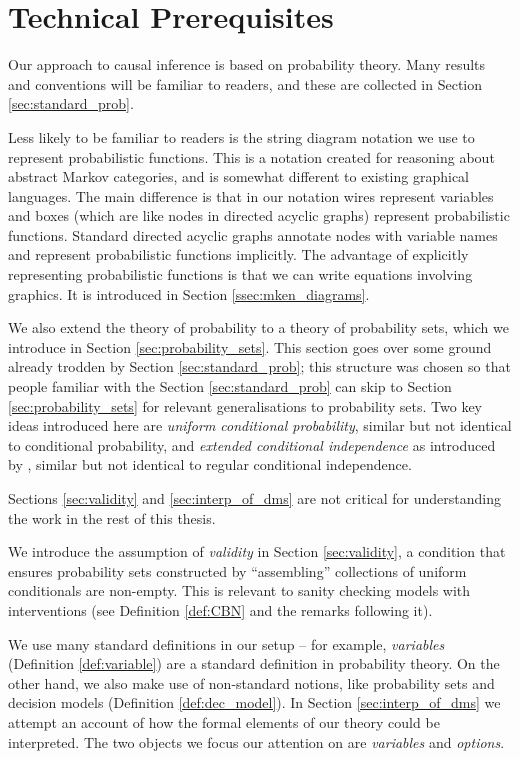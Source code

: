 

\chapter{Technical Prerequisites}\label{ch:tech_prereq}

Our approach to causal inference is based on probability theory. Many results and conventions will be familiar to readers, and these are collected in Section \ref{sec:standard_prob}.

Less likely to be familiar to readers is the string diagram notation we use to represent probabilistic functions. This is a notation created for reasoning about abstract Markov categories, and is somewhat different to existing graphical languages. The main difference is that in our notation wires represent variables and boxes (which are like nodes in directed acyclic graphs) represent probabilistic functions. Standard directed acyclic graphs annotate nodes with variable names and represent probabilistic functions implicitly. The advantage of explicitly representing probabilistic functions is that we can write equations involving graphics. It is introduced in Section \ref{ssec:mken_diagrams}.

We also extend the theory of probability to a theory of probability sets, which we introduce in Section \ref{sec:probability_sets}. This section goes over some ground already trodden by Section \ref{sec:standard_prob}; this structure was chosen so that people familiar with the Section \ref{sec:standard_prob} can skip to Section \ref{sec:probability_sets} for relevant generalisations to probability sets. Two key ideas introduced here are \emph{uniform conditional probability}, similar but not identical to conditional probability, and \emph{extended conditional independence} as introduced by \citet{constantinou_extended_2017}, similar but not identical to regular conditional independence.

Sections \ref{sec:validity} and \ref{sec:interp_of_dms} are not critical for understanding the work in the rest of this thesis. 

We introduce the assumption of \emph{validity} in Section \ref{sec:validity}, a condition that ensures probability sets constructed by ``assembling'' collections of uniform conditionals are non-empty. This is relevant to sanity checking models with interventions (see Definition \ref{def:CBN} and the remarks following it).

We use many standard definitions in our setup -- for example, \emph{variables} (Definition \ref{def:variable}) are a standard definition in probability theory. On the other hand, we also make use of non-standard notions, like probability sets and decision models (Definition \ref{def:dec_model}). In Section \ref{sec:interp_of_dms} we attempt an account of how the formal elements of our theory could be interpreted. The two objects we focus our attention on are \emph{variables} and \emph{options}.

